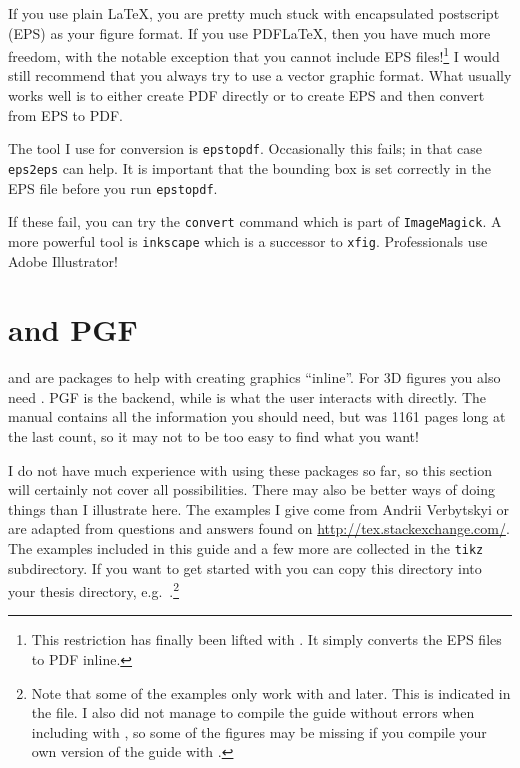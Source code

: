 If you use plain \LaTeX, you are pretty much stuck with encapsulated
postscript (EPS) as your figure format. If you use PDF\LaTeX, then you
have much more freedom, with the notable exception that you cannot
include EPS files!\footnote{%
This restriction has finally been lifted with . It
simply converts the EPS files to PDF inline.}
I would still recommend that you always try to use
a vector graphic format. What usually works well is to either create
PDF directly or to create EPS and then convert from EPS to PDF\@.

The tool I use for conversion is \texttt{epstopdf}. Occasionally this
fails; in that case \texttt{eps2eps} can help. It is important that
the bounding box is set correctly in the EPS file before you run
\texttt{epstopdf}.

If these fail, you can try the \texttt{convert} command which is part
of \texttt{ImageMagick}. A more powerful tool is \texttt{inkscape}
which is a successor to \texttt{xfig}. Professionals use Adobe Illustrator!


\section{\TikZ and PGF}%
\label{sec:fig:tikz}

 and  are packages to help with
creating graphics \enquote{inline}. For 3D figures you also need
. PGF is the backend, while \TikZ is what the
user interacts with directly. The manual contains all the information
you should need, but was 1161 pages long at the last count, so it may
not to be too easy to find what you want!

I do not have much experience with using these packages so far, so
this section will certainly not cover all possibilities. There may
also be better ways of doing things than I illustrate here. The
examples I give come from Andrii Verbytskyi or are adapted from
questions and answers found on
\url{http://tex.stackexchange.com/}. The examples included in this
guide and a few more are collected in the \texttt{tikz}
subdirectory.
If you want to get started with \TikZ you can copy this directory
into your thesis directory, e.g.\ .\footnote{%
Note that some of the examples only work with  and later. This is indicated in the file. I also did not manage
to compile the guide without errors when including  with
, so some of the figures may be missing if you compile
your own version of the guide with .}

